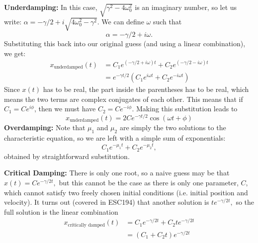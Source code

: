 \documentclass{article}
\begin{document}
\textbf{Underdamping:} In this case, $\sqrt{\gamma^2-4\omega_0^2}$ is an imaginary number, so let us write: $\alpha = -\gamma/2 + i\sqrt{4\omega_0^2-\gamma^2}$. We can define $\omega$ such that 
\begin{equation}
    \alpha = -\gamma/2 + i\omega.
\end{equation}
Substituting this back into our original guess (and using a linear combination), we get: 
\begin{align}
    x_\text{underdamped}(t) &= C_1e^{(-\gamma/2 + i\omega)t}+C_2e^{(-\gamma/2 - i\omega)t} \\ 
    &= e^{-\gamma t/2}\left(C_1e^{i\omega t} + C_2e^{-i\omega t}\right)
\end{align}
Since $x(t)$ has to be real, the part inside the parentheses has to be real, which means the two terms are complex conjugates of each other. This means that if $C_1=Ce^{i\phi}$, then we must have $C_2 =Ce^{-i\phi}$. Making this substitution leads to 
\begin{equation}
    x_\text{underdamped}(t) = 2Ce^{-\gamma t/2}\cos(\omega t+\phi)
\end{equation}
\textbf{Overdamping:} Note that $\mu_1$ and $\mu_2$ are simply the two solutions to the characteristic equation, so we are left with a simple sum of exponentials: 
\begin{equation}
    C_1e^{-\mu_1 t} + C_2e^{-\mu_2 t},
\end{equation}
obtained by straightforward substitution.

\textbf{Critical Damping:} There is only one root, so a naive guess may be that $x(t) = Ce^{-\gamma/2 t},$ but this cannot be the case as there is only one parameter, $C$, which cannot satisfy two freely chosen initial conditions (i.e. initial position and velocity). It turns out (covered in ESC194) that another solution is $te^{-\gamma/2 t},$ so the full solution is the linear combination 
\begin{align}
    x_\text{critically damped}(t) &= C_1e^{-\gamma/2 t} + C_2te^{-\gamma/2 t} \\ 
    &= (C_1+C_2t)e^{-\gamma/2 t}
\end{align} 
\end{document}
